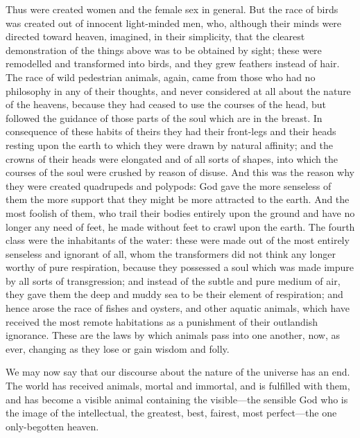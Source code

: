 Thus were created women and the female sex in general. But the race of
birds was created out of innocent light-minded men, who, although their
minds were directed toward heaven, imagined, in their simplicity, that the
clearest demonstration of the things above was to be obtained by sight;
these were remodelled and transformed into birds, and they grew feathers
instead of hair. The race of wild pedestrian animals, again, came from
those who had no philosophy in any of their thoughts, and never considered
at all about the nature of the heavens, because they had ceased to use the
courses of the head, but followed the guidance of those parts of the soul
which are in the breast. In consequence of these habits of theirs they had
their front-legs and their heads resting upon the earth to which they were
drawn by natural affinity; and the crowns of their heads were elongated
and of all sorts of shapes, into which the courses of the soul were
crushed by reason of disuse. And this was the reason why they were created
quadrupeds and polypods: God gave the more senseless of them the more
support that they might be more attracted to the earth. And the most
foolish of them, who trail their bodies entirely upon the ground and have
no longer any need of feet, he made without feet to crawl upon the earth.
The fourth class were the inhabitants of the water: these were made out of
the most entirely senseless and ignorant of all, whom the transformers did
not think any longer worthy of pure respiration, because they possessed a
soul which was made impure by all sorts of transgression; and instead of
the subtle and pure medium of air, they gave them the deep and muddy sea
to be their element of respiration; and hence arose the race of fishes and
oysters, and other aquatic animals, which have received the most remote
habitations as a punishment of their outlandish ignorance. These are the
laws by which animals pass into one another, now, as ever, changing as
they lose or gain wisdom and folly.

We may now say that our discourse about the nature of the universe has an
end. The world has received animals, mortal and immortal, and is fulfilled
with them, and has become a visible animal containing the visible—the
sensible God who is the image of the intellectual, the greatest, best,
fairest, most perfect—the one only-begotten heaven.
